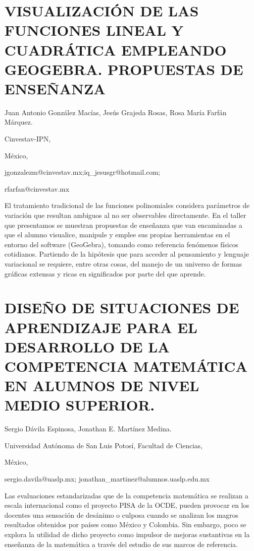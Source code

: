 \section{VISUALIZACIÓN DE LAS FUNCIONES LINEAL Y CUADRÁTICA EMPLEANDO GEOGEBRA.
PROPUESTAS DE ENSEÑANZA}

\begin{datos}

Juan Antonio González Macías, Jesús Grajeda Rosas, Rosa María Farfán
Márquez.

Cinvestav-IPN, 

México,

jgonzalezm@cinvestav.mx;iq\_jesusgr@hotmail.com;

rfarfan@cinvestav.mx

\end{datos}

El tratamiento tradicional de las funciones polinomiales considera
parámetros de variación que resultan ambiguos al no ser observables
directamente. En el taller que presentamos se muestran propuestas
de enseñanza que van encaminadas a que el alumno visualice, manipule
y emplee sus propias herramientas en el entorno del software (GeoGebra),
tomando como referencia fenómenos físicos cotidianos. Partiendo de
la hipótesis que para acceder al pensamiento y lenguaje variacional
se requiere, entre otras cosas, del manejo de un universo de formas
gráficas extensas y ricas en significados por parte del que aprende.


\section{\uppercase{ Diseño de Situaciones de Aprendizaje para el Desarrollo
de la Competencia Matemática en alumnos de nivel medio superior.}}

\begin{datos}

Sergio Dávila Espinosa, Jonathan E. Martínez Medina.

Universidad Autónoma de San Luis Potosí, Facultad de Ciencias,

México,

sergio.davila@uaslp.mx; jonathan\_martinez@alumnos.uaslp.edu.mx

\end{datos}

Las evaluaciones estandarizadas que de la competencia matemática se
realizan a escala internacional como el proyecto PISA de la OCDE,
pueden provocar en los docentes una sensación de desánimo o culposa
cuando se analizan los magros resultados obtenidos por países como
México y Colombia. Sin embargo, poco se explora la utilidad de dicho
proyecto como impulsor de mejoras sustantivas en la enseñanza de la
matemática a través del estudio de sus marcos de referencia. 

